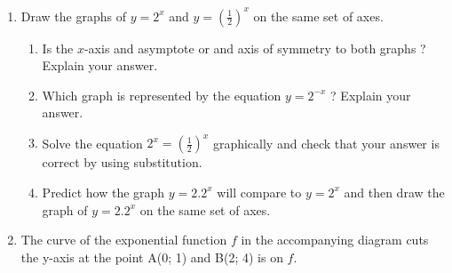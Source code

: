           
          \label{m39348*id253033}\begin{enumerate}[noitemsep, label=\textbf{\arabic*}. ] 
            \label{m39348*uid197}\item Draw the graphs of \begin{math}y={2}^{x}\end{math} and \begin{math}y={\left(\frac{1}{2}\right)}^{x}\end{math} on the same set of axes.
\label{m39348*id253098}\begin{enumerate}[noitemsep, label=\textbf{\alph*}. ] 
            \label{m39348*uid198}\item Is the \begin{math}x\end{math}-axis and asymptote or and axis of symmetry to both graphs ? Explain your answer.
\label{m39348*uid199}\item Which graph is represented by the equation \begin{math}y={2}^{-x}\end{math} ? Explain your answer.
\label{m39348*uid200}\item Solve the equation \begin{math}{2}^{x}={\left(\frac{1}{2}\right)}^{x}\end{math} graphically and check that your answer is correct by using substitution.
\label{m39348*uid201}\item Predict how the graph \begin{math}y=2.{2}^{x}\end{math} will compare to \begin{math}y={2}^{x}\end{math} and then draw the graph of \begin{math}y=2.{2}^{x}\end{math} on the same set of axes.
\end{enumerate}
                \label{m39348*uid202}\item The curve of the exponential function \begin{math}f\end{math} in the accompanying diagram cuts the y-axis at the point A(0; 1) and B(2; 4) is on \begin{math}f\end{math}.

    \setcounter{subfigure}{0}



\end{enumerate}
